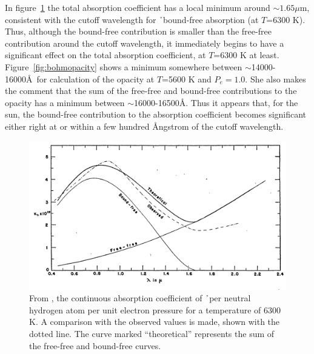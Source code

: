 In figure~\ref{fig:chandratotal} the total
absorption coefficient has a local minimum around $\sim1.65\mu$m,
consistent with the cutoff wavelength for \h\ bound-free absorption (at $T$=6300 K).  Thus, although the bound-free contribution is smaller than the free-free contribution around the cutoff wavelength, it immediately begins to have a significant effect on the total absorption coefficient, at $T$=6300 K at least.  Figure~\ref{fig:bohmopacity} shows a minimum somewhere between $\sim$14000-16000\AA\ for \cite{boehm1989} calculation of the opacity at $T$=5600 K and $P_e=1.0$.  She also makes the comment that the sum of the free-free and bound-free contributions to the opacity has a minimum between $\sim$16000-16500\AA. Thus it appears that, for the sun, the bound-free contribution to the absorption coefficient becomes significant either right at or within a few hundred \AA ngstrom of the cutoff wavelength.
\begin{figure}
\includegraphics[width=\linewidth]{figs/chandraopacity.png}
\caption{\label{fig:chandratotal}From \cite{chandra1946}, the continuous absorption coefficient of \h\ per neutral hydrogen atom per unit electron pressure for a temperature of 6300 K.  A comparison with the observed values is made, shown with the dotted line.  The curve marked ``theoretical'' represents the sum of the free-free and bound-free curves.}
\end{figure}


